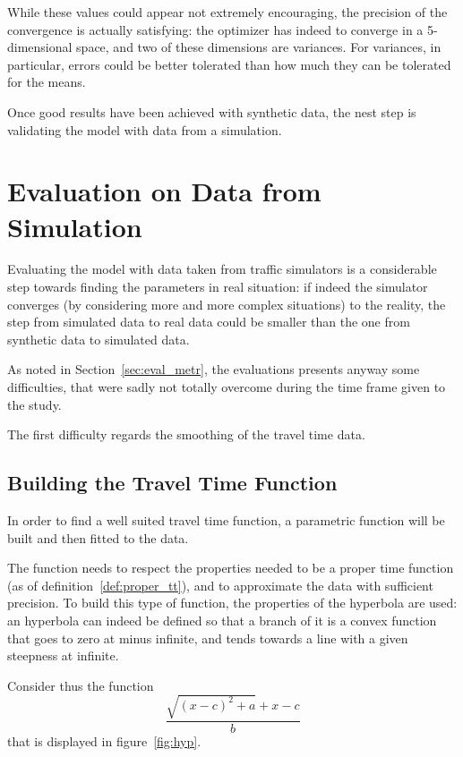 While these values could appear not extremely encouraging,
the precision of the convergence is actually satisfying:
the optimizer has indeed to converge in a 5-dimensional space,
and two of these dimensions are variances.
For variances, in particular, errors could be better tolerated than how much they can be tolerated for the means.

Once good results have been achieved with synthetic data,
the nest step is validating the model with data from a simulation.

\section{Evaluation on Data from Simulation}
\label{sec:res_eval_metr}

Evaluating the model with data taken from traffic simulators is a considerable step towards finding the parameters in real situation:
if indeed the simulator converges (by considering more and more complex situations) to the reality,
the step from simulated data to real data could be smaller than the one from synthetic data to simulated data.

As noted in Section~\ref{sec:eval_metr},
the evaluations presents anyway some difficulties,
that were sadly not totally overcome during the time frame given to the study.

The first difficulty regards the smoothing of the travel time data.

\subsection{Building the Travel Time Function}

In order to find a well suited travel time function,
a parametric function will be built and then fitted to the data.

The function needs to respect the properties needed to be a proper time function (as of definition~\ref{def:proper_tt}),
and to approximate the data with sufficient precision.
To build this type of function,
the properties of the hyperbola are used:
an hyperbola can indeed be defined so that a branch of it is a convex function that goes to zero at minus infinite,
and tends towards a line with a given steepness at infinite.

Consider thus the function
\begin{equation}
  \label{eq:hyperbola}
  \frac{\sqrt{(x - c)^2 + a} + x - c}{b}
\end{equation}
that is displayed in figure~\ref{fig:hyp}.

